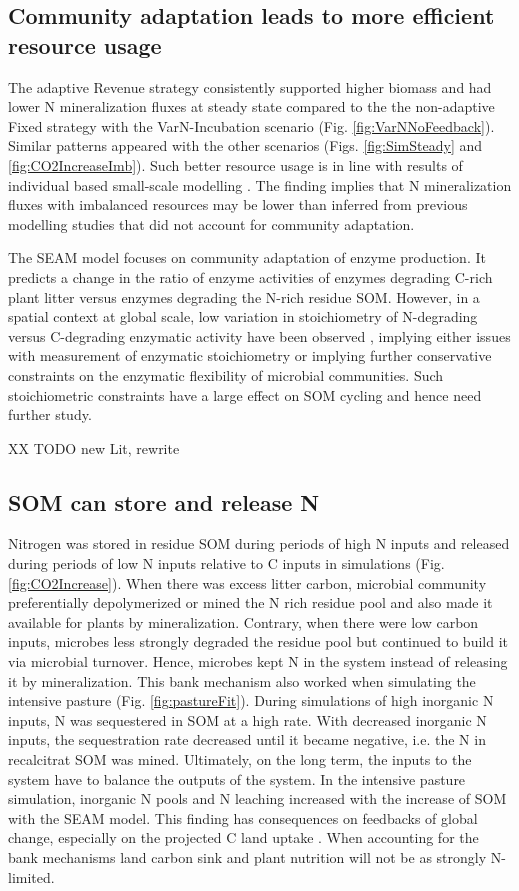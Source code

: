 \subsection{Community adaptation leads to more efficient resource usage}
The adaptive Revenue strategy consistently supported higher biomass and had
lower N mineralization fluxes at steady state compared to the the non-adaptive
Fixed strategy with the VarN-Incubation scenario (Fig.
\ref{fig:VarNNoFeedback}). Similar patterns appeared with the other scenarios
(Figs. \ref{fig:SimSteady} and \ref{fig:CO2IncreaseImb}). Such better resource
usage is in line with results of individual based small-scale modelling
\citep{Kaiser14}.
The finding implies that N mineralization fluxes with imbalanced resources may
be lower than inferred from previous modelling studies that did not account for
community adaptation.

The SEAM model focuses on community adaptation of enzyme production. It predicts
a change in the ratio of enzyme activities of enzymes degrading C-rich plant
litter versus enzymes degrading the N-rich residue SOM.
However, in a spatial context at global scale, low variation in stoichiometry
of N-degrading versus C-degrading enzymatic activity have been observed
\citep{Sinsabaugh09}, implying either issues with measurement of enzymatic
stoichiometry or implying further conservative constraints on the enzymatic
flexibility of microbial communities.
Such stoichiometric constraints have a large effect on SOM cycling and hence
need further study.

XX TODO new Lit, rewrite

\subsection{SOM can store and release N}
Nitrogen was stored in residue SOM during periods of high N inputs and
released during periods of low N inputs relative to C inputs in simulations
(Fig.
\ref{fig:CO2Increase}). When there was excess litter carbon, microbial community
preferentially depolymerized or mined the N rich residue pool and also
made it available for plants by mineralization.
Contrary, when there were low carbon inputs, microbes less strongly degraded the
residue pool but continued to build it via microbial turnover.
Hence, microbes kept N in the system instead of releasing it by mineralization.
This bank mechanism \citep{Perveen14} also worked when simulating the intensive
pasture (Fig. \ref{fig:pastureFit}). During simulations of high inorganic N
inputs, N was sequestered in SOM at a high rate. With decreased inorganic N
inputs, the sequestration rate decreased until it became negative, i.e. the N
in recalcitrat SOM was mined. Ultimately, on the long term, the inputs to the
system have to balance the outputs of the system. In the intensive pasture simulation,
inorganic N pools and N leaching increased with the increase of SOM with the
SEAM model. This finding has consequences on feedbacks of global change, especially
on the projected C land uptake \citep{Friedlingstein14}. When accounting for the
bank mechanisms land carbon sink and plant nutrition will not be as strongly
N-limited.

